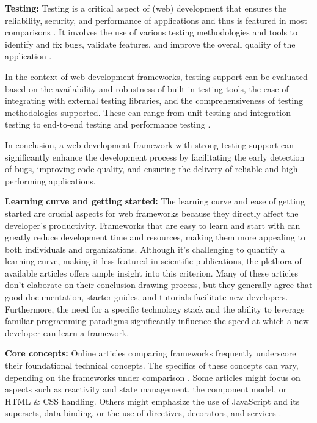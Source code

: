 \textbf{Testing:}
Testing is a critical aspect of (web) development that ensures the reliability, security, and performance of applications and thus is featured in most comparisons \cite{DelSalasZarate.2015, M.Kaluza.2019}.
It involves the use of various testing methodologies and tools to identify and fix bugs, validate features, and improve the overall quality of the application \cite{Delcev.2018}.

In the context of web development frameworks, testing support can be evaluated based on the availability and robustness of built-in testing tools, the ease of integrating with external testing libraries, and the comprehensiveness of testing methodologies supported. These can range from unit testing and integration testing to end-to-end testing and performance testing \cite{Banu.2023}.

In conclusion, a web development framework with strong testing support can significantly enhance the development process by facilitating the early detection of bugs, improving code quality, and ensuring the delivery of reliable and high-performing applications.

\textbf{Learning curve and getting started:}
The learning curve and ease of getting started are crucial aspects for web frameworks because they directly affect the developer's productivity. Frameworks that are easy to learn and start with can greatly reduce development time and resources, making them more appealing to both individuals and organizations. Although it's challenging to quantify a learning curve, making it less featured in scientific publications, the plethora of available articles offers ample insight into this criterion. Many of these articles don't elaborate on their conclusion-drawing process, but they generally agree that good documentation, starter guides, and tutorials facilitate new developers. Furthermore, the need for a specific technology stack and the ability to leverage familiar programming paradigms significantly influence the speed at which a new developer can learn a framework. 

\textbf{Core concepts:}
Online articles comparing frameworks frequently underscore their foundational technical concepts. The specifics of these concepts can vary, depending on the frameworks under comparison \cite{Vue.2023}.
Some articles might focus on aspects such as reactivity and state management, the component model, or HTML & CSS handling. Others might emphasize the use of JavaScript and its supersets, data binding, or the use of directives, decorators, and services \cite{Springer.2018, Neuhaus.2017}.

